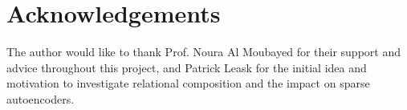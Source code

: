 \section*{Acknowledgements}

The author would like to thank Prof. Noura Al Moubayed for their support and advice throughout this project, and Patrick Leask for the initial idea and motivation to investigate relational composition and the impact on sparse autoencoders.